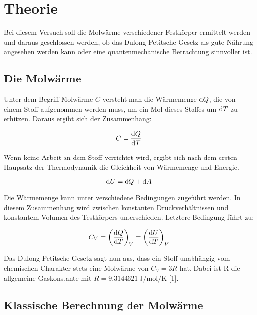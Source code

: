 \section{Theorie}
\label{sec:Theorie}

Bei diesem Versuch soll die Molwärme verschiedener Festkörper
ermittelt werden und daraus geschlossen werden, ob das 
Dulong-Petitsche Gesetz als gute Nährung angesehen werden kann
oder eine quantenmechanische Betrachtung sinnvoller ist. 

\subsection{Die Molwärme}
\label{sec:Molwaerme}

Unter dem Begriff Molwärme $C$ versteht man die Wärmemenge $\mathop{}\!\mathrm{d} Q$, 
die von einem Stoff aufgenommen werden muss, um ein Mol 
dieses Stoffes um $\mathop{}\!\mathrm{d} T$ zu erhitzen. Daraus ergibt sich der 
Zusammenhang:

\begin{equation*}
C = \frac{\mathop{}\!\mathrm{d} Q}{\mathop{}\!\mathrm{d} T}
\end{equation*}

Wenn keine Arbeit an dem Stoff verrichtet wird, ergibt sich
nach dem ersten Haupsatz der Thermodynamik die Gleichheit 
von Wärmemenge und Energie. 

\begin{equation*}
\mathop{}\!\mathrm{d} U = \mathop{}\!\mathrm{d} Q + \mathop{}\!\mathrm{d} A
\end{equation*}

Die Wärmemenge kann unter verschiedene Bedingungen zugeführt 
werden. In diesem Zusammenhang wird zwischen konstanten 
Druckverhältnissen und konstantem Volumen des Testkörpers 
unterschieden. Letztere Bedingung führt zu: 

\begin{equation}
C_V = \left(\frac{\mathop{}\!\mathrm{d} Q}{\mathop{}\!\mathrm{d} T}\right)_V = \left(\frac{\mathop{}\!\mathrm{d} U}{\mathop{}\!\mathrm{d} T}\right)_V
\label{eqn:Molwaerme}
\end{equation}

Das Dulong-Petitsche Gesetz sagt nun aus, dass ein Stoff 
unabhängig vom chemischen Charakter stets eine Molwärme von
$C_V = 3 R$ hat. Dabei ist R die allgemeine Gaskonstante mit 
$R = \SI{9.3144621}{\joule\per\mol\per\kelvin}$ [1].

\subsection{Klassische Berechnung der Molwärme}
\label{sec:Klassisch}

